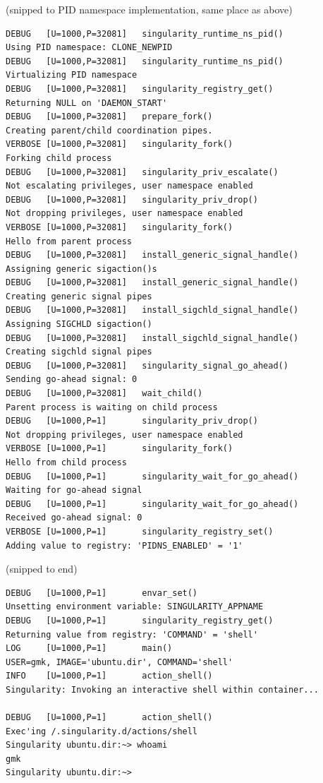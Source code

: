 \documentclass[a4paper]{article}
\begin{document}
(snipped to PID namespace implementation, same place as above)\\[0.1in]
\begin{lstlisting}[frame=single]
DEBUG   [U=1000,P=32081]   singularity_runtime_ns_pid()              Using PID namespace: CLONE_NEWPID
DEBUG   [U=1000,P=32081]   singularity_runtime_ns_pid()              Virtualizing PID namespace
DEBUG   [U=1000,P=32081]   singularity_registry_get()                Returning NULL on 'DAEMON_START'
DEBUG   [U=1000,P=32081]   prepare_fork()                            Creating parent/child coordination pipes.
VERBOSE [U=1000,P=32081]   singularity_fork()                        Forking child process
DEBUG   [U=1000,P=32081]   singularity_priv_escalate()               Not escalating privileges, user namespace enabled
DEBUG   [U=1000,P=32081]   singularity_priv_drop()                   Not dropping privileges, user namespace enabled
VERBOSE [U=1000,P=32081]   singularity_fork()                        Hello from parent process
DEBUG   [U=1000,P=32081]   install_generic_signal_handle()           Assigning generic sigaction()s
DEBUG   [U=1000,P=32081]   install_generic_signal_handle()           Creating generic signal pipes
DEBUG   [U=1000,P=32081]   install_sigchld_signal_handle()           Assigning SIGCHLD sigaction()
DEBUG   [U=1000,P=32081]   install_sigchld_signal_handle()           Creating sigchld signal pipes
DEBUG   [U=1000,P=32081]   singularity_signal_go_ahead()             Sending go-ahead signal: 0
DEBUG   [U=1000,P=32081]   wait_child()                              Parent process is waiting on child process
DEBUG   [U=1000,P=1]       singularity_priv_drop()                   Not dropping privileges, user namespace enabled
VERBOSE [U=1000,P=1]       singularity_fork()                        Hello from child process
DEBUG   [U=1000,P=1]       singularity_wait_for_go_ahead()           Waiting for go-ahead signal
DEBUG   [U=1000,P=1]       singularity_wait_for_go_ahead()           Received go-ahead signal: 0
VERBOSE [U=1000,P=1]       singularity_registry_set()                Adding value to registry: 'PIDNS_ENABLED' = '1'

\end{lstlisting}

(snipped to end)

\begin{lstlisting}[frame=single]
DEBUG   [U=1000,P=1]       envar_set()                               Unsetting environment variable: SINGULARITY_APPNAME
DEBUG   [U=1000,P=1]       singularity_registry_get()                Returning value from registry: 'COMMAND' = 'shell'
LOG     [U=1000,P=1]       main()                                    USER=gmk, IMAGE='ubuntu.dir', COMMAND='shell'
INFO    [U=1000,P=1]       action_shell()                            Singularity: Invoking an interactive shell within container...

DEBUG   [U=1000,P=1]       action_shell()                            Exec'ing /.singularity.d/actions/shell
Singularity ubuntu.dir:~> whoami
gmk
Singularity ubuntu.dir:~> 
\end{lstlisting}
\end{document}
